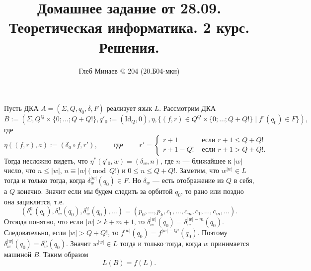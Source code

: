 \documentclass[12pt,a4paper]{article}
\title{Домашнее задание от 28.09.\\Теоретическая информатика. 2 курс.\\Решения.}
\author{Глеб Минаев @ 204 (20.Б04-мкн)}
\newcommand{\Id}{\mathrm{Id}}
\begin{document}
    \maketitle

    \begin{multicols}{2}
        \tableofcontents
    \end{multicols}

    \begin{problem}{2}
        Пусть ДКА $A = (\Sigma, Q, q_0, \delta, F)$ реализует язык $L$. Рассмотрим ДКА
        \[B := (\Sigma, Q^Q \times \{0; \dots; Q + Q!\}, q'_0 := (\Id_Q, 0), \eta, \{(f, r) \in Q^Q \times \{0; \dots; Q + Q!\} \mid f^r(q_0) \in F\}),\]
        где
        \[
            \eta((f, r), a) := (\delta_a \circ f, r'),
            \qquad \text{ где } \qquad
            r' =
            \begin{cases}
                r + 1& \text{ если } r + 1 \leqslant Q + Q!\\
                r + 1 - Q!& \text{ если } r + 1 > Q + Q!.
            \end{cases}
        \]
        Тогда несложно видеть, что $\eta^*(q'_0, w) = (\delta_w, n)$, где $n$ --- ближайшее к $|w|$ число, что $n \leqslant |w|$, $n \equiv |w| \pmod{Q!}$ и $0 \leqslant n \leqslant Q + Q!$. Заметим, что $w^{|w|} \in L$ тогда и только тогда, когда $\delta_w^{|w|}(q_0) \in F$. Но $\delta_w$ --- есть отображение из $Q$ в себя, а $Q$ конечно. Значит если мы будем следить за орбитой $q_0$, то рано или поздно она зациклится, т.е.
        \[(\delta_w^0(q_0), \delta_w^1(q_0), \delta_w^2(q_0), \dots) = (p_0, \dots, p_k, c_1, \dots, c_m, c_1, \dots, c_m, \dots).\]
        Отсюда понятно, что если $|w| \geqslant k + m + 1$, то $\delta_w^{|w|}(q_0) = \delta_w^{|w|-m}(q_0)$. Следовательно, если $|w| > Q + Q!$, то $f^{|w|}(q_0) = f^{|w| - Q!}(q_0)$. Поэтому $\delta_w^{|w|}(q_0) = \delta_w^n(q_0)$. Значит $w^{|w|} \in L$ тогда и только тогда, когда $w$ принимается машиной $B$.
        Таким образом
        \[L(B) = f(L).\]
    \end{problem}
\end{document}
